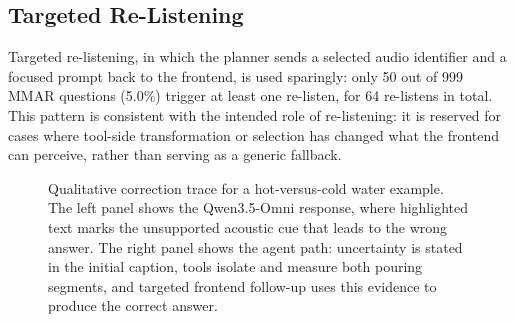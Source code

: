 \documentclass[11pt]{article}
\begin{document}
\begin{table}[t]
\small
\centering
{}
\caption{Top-10 most invoked tools on MMAR. Q-share is the percentage of questions invoking the tool at least once.}
\label{tab:top_tools}
\end{table}

\subsection{Targeted Re-Listening}

Targeted re-listening, in which the planner sends a selected audio identifier and a focused prompt back to the frontend, is used sparingly: only 50 out of 999 MMAR questions (5.0\%) trigger at least one re-listen, for 64 re-listens in total. This pattern is consistent with the intended role of re-listening: it is reserved for cases where tool-side transformation or selection has changed what the frontend can perceive, rather than serving as a generic fallback.

\begin{figure}[t]
  \centering
  \resizebox{\textwidth}{!}{}
  \caption{Qualitative correction trace for a hot-versus-cold water example. The left panel shows the Qwen3.5-Omni response, where highlighted text marks the unsupported acoustic cue that leads to the wrong answer. The right panel shows the agent path: uncertainty is stated in the initial caption, tools isolate and measure both pouring segments, and targeted frontend follow-up uses this evidence to produce the correct answer.}
  \label{fig:case_study_hot_water}
\end{figure}
\end{document}
